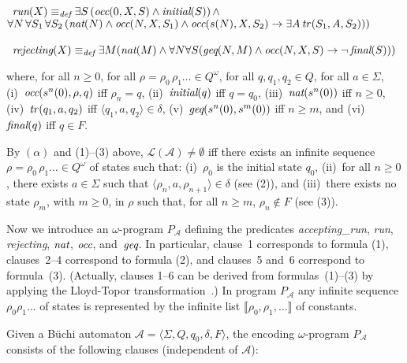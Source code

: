 \documentclass[english]{tlp}
\newcommand{\Mathit}[1]{\mbox{\it #1}}
\begin{document}
\begin{example}
\smallskip
\noindent{}~$\Mathit{run}(X)\equiv_{\scriptsize{\Mathit{def}}}\exists
S\,(\Mathit{occ}(0,X,S) \wedge \Mathit{initial}(S))\,\wedge$\\
\noindent\makebox[9mm][l]{} $\forall N\,\forall S_1\,\forall S_2\,
(\Mathit{nat}(N) \wedge \Mathit{occ}(N,X,S_1) \wedge \Mathit{occ}(s(N),X,S_2)
\rightarrow \exists A\, \Mathit{tr\/}(S_1,A,S_2)))$

\smallskip
\noindent{}~$\mbox{\it{rejecting}}(X)\equiv_{\scriptsize{\Mathit{def}}}\exists
M(\Mathit{nat}(M)\wedge\forall N\forall S
(\Mathit{geq}(N,M)\wedge \Mathit{occ}(N,X,S) \rightarrow
\neg\, \Mathit{final}(S)))$

\smallskip
\noindent where, for all $n\!\geq\! 0$, for all $\rho\!=\!\rho_0\,\rho_1\ldots\in Q^\omega$, for all
$q,q_1, q_2\!\in\! Q$, for all $a\!\in\!\Sigma$, 
(i)~$\Mathit{occ}(s^n(0),\rho,q)$ iff $\rho_n\!= \!q$, 
(ii)~$\Mathit{initial}(q)$ iff $q\!=\!q_0$, 
(iii)~$\Mathit{nat}(s^n(0))$ iff $n\!\geq \!0$, 
(iv)~$\Mathit{tr\/}(q_1,a,q_2)$ iff 
     $\langle q_1,a,q_2\rangle\!\in\!\delta$, 
(v)~$\Mathit{geq}(s^n(0),s^m(0))$ iff $n\!\geq\! m$, and
(vi)~$\Mathit{final}(q)$ iff $q\!\in\! F$.

By $(\alpha)$ and (1)--(3) above, $\mathcal L(\mathcal A)\neq\emptyset$ iff there
exists an infinite sequence $\rho\!=\!\rho_0\,\rho_1\ldots\in Q^\omega$ of
states such that: (i)~$\rho_0$ is the initial state $q_0$, (ii)~for 
all $n\!\geq\!0$, there exists $a\in\Sigma$ such that 
$\langle \rho_n,a,\rho_{n+1}\rangle\in\delta$ (see (2)), and (iii)~there exists no state 
$\rho_m$, with $m\!\geq\!0$, in $\rho$  such that, for all $n\!\geq\! m$, $\rho_n\notin F$ (see (3)).

Now we introduce an 
$\omega$-program $P_{\mathcal A}$ defining the predicates
{\it {accepting\_run}}, {\it run}, {\it{rejecting}},
$\Mathit{nat}$, $\Mathit{occ}$, and~$\Mathit{geq}$.
In particular, clause~1 corresponds to formula (1),
clauses~2--4 correspond to formula (2), and
clauses~5 and~6 correspond to formula~(3). 
(Actually, 
clauses 1--6 can be derived from formulas~(1)--(3)
by applying the Lloyd-Topor transformation~\cite{Llo87}.)
In program
$P\!_{\mathcal A}$ any infinite sequence $\rho_0\rho_1\!\ldots$ of states is
represented by the infinite list
$\llbracket\rho_0,\rho_1,\ldots\rrbracket\!$ of constants.

Given a B\"{u}chi automaton $\mathcal A =
\langle\Sigma,Q,q_0,\delta,F\rangle$, the encoding $\omega$-program
$P\!_{\mathcal{A}}$ consists of the following clauses (independent of
$\mathcal A$):


\end{example}
\end{document}
